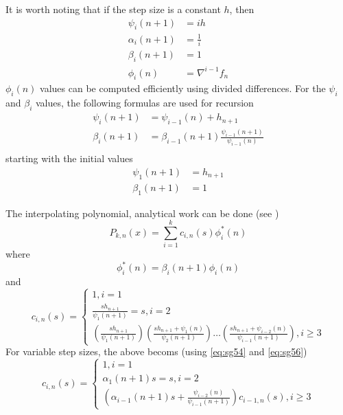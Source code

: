 It is worth noting that if the step size is a constant $h$, then 
\begin{equation}
  \begin{aligned}
    \psi _i(n+1)   &= ih \\
    \alpha _i(n+1) &= \frac{1}{i} \\
    \beta _i(n+1)  &= 1 \\
    \phi _i(n)     &= \nabla ^{i-1} f_{n}
  \end{aligned}
\end{equation}
$\phi _i (n)$ values can be computed efficiently using divided differences. For 
the $\psi _i$ and $\beta _i$ values, the following formulas are used for recursion 
\begin{equation}
  \begin{aligned}
    \psi _i (n+1)  &= \psi _{i-1} (n) + h_{n+1} \\
    \beta _i (n+1) &= \beta _{i-1}(n+1) \frac{\psi _{i-1} (n+1)}{\psi _{i-1}(n)} \\
  \end{aligned}
\end{equation}
starting with the initial values
\begin{equation}
  \begin{aligned}
    \psi _1 (n+1) &= h_{n+1} \\
    \beta _1(n+1) &= 1
  \end{aligned}
\end{equation}

The interpolating polynomial, analytical work can be done (see \cite{Shampine1975}) 
\begin{equation}\label{eq:sg57}
  P_{k,n} (x) = \sum_{i=1}^{k} c_{i,n} (s) \phi ^{*}_{i} (n)
\end{equation}
where
\begin{equation}
  \phi ^{*}_{i} (n) = \beta _i (n+1) \phi _i (n)
\end{equation}
and
\begin{equation}\label{eq:sg56}
  c_{i,n}(s) = \begin{cases}
    1, i=1 \\
    \frac{s h_{n+1}}{\psi _1 (n+1)} = s, i=2 \\
    \left(\frac{sh_{n+1}}{\psi _1(n+1)}\right)
    \left(\frac{sh_{n+1} + \psi _1(n)}{\psi _2(n+1)}\right)
    \dots
    \left(\frac{sh_{n+1} + \psi _{i-2}(n)}{\psi _{i-1}(n+1)}\right), i \ge 3
  \end{cases}
\end{equation}
For variable step sizes, the above becoms (using \autoref{eq:sg54} and \autoref{eq:sg56})
\begin{equation}\label{}
  c_{i,n}(s) = \begin{cases}
    1, i=1 \\
    \alpha _1 (n+1) s = s, i=2 \\
    \left( \alpha _{i-1} (n+1) s + \frac{\psi _{i-2}(n)}{\psi _{i-1}(n+1)} \right) c_{i-1,n}(s) , i \ge 3
  \end{cases}
\end{equation}

